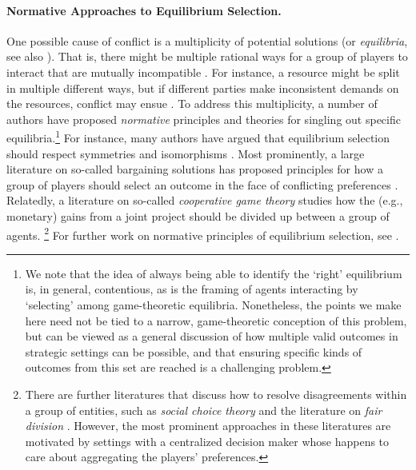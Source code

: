 \paragraph{Normative Approaches to Equilibrium Selection.} 
One possible cause of conflict is a multiplicity of potential solutions (or \textit{equilibria}, see also ).
That is, there might be multiple rational ways for a group of players to interact that are mutually incompatible \citep{Stastny2021, duan2024gtbench}.
For instance, a resource might be split in multiple different ways, but if different parties make inconsistent demands on the resources, conflict may ensue \citep{piatti2024cooperatecollapseemergencesustainable}.
To address this multiplicity, a number of authors have proposed \textit{normative} principles and theories for singling out specific equilibria.\footnote{We note that the idea of always being able to identify the `right' equilibrium is, in general, contentious, as is the framing of agents interacting by `selecting' among game-theoretic equilibria. Nonetheless, the points we make here need not be tied to a narrow, game-theoretic conception of this problem, but can be viewed as a general discussion of how multiple valid outcomes in strategic settings can be possible, and that ensuring specific kinds of outcomes from this set are reached is a challenging problem.}
For instance, many authors have argued that equilibrium selection should respect symmetries and isomorphisms \citep{harsanyi1988general,Hu2020,Treutlein2021,Emmons2022,oesterheld2022safe}.
Most prominently, a large literature on so-called bargaining solutions has proposed principles for how a group of players should select an outcome in the face of conflicting preferences \citep{nash1950bargaining,kalai1975other}. Relatedly, a literature on so-called \textit{cooperative game theory} \citep{shapley1953value,gillies1959solutions,schmeidler1969nucleolus,Driessen1988,chalkiadakis2011computational} studies how the (e.g., monetary) gains from a joint project should be divided up between a group of agents.
\footnote{There are further literatures that discuss how to resolve disagreements within a group of entities, such as \textit{social choice theory} \citep{Gaertner2010} and the literature on \textit{fair division} \citep{Brams1996}. However, the most prominent approaches in these literatures are motivated by settings with a centralized decision maker whose happens to care about aggregating the players' preferences.}
For further work on normative principles of equilibrium selection, see \citet{Schelling1980-cq,harsanyi1988general}.

